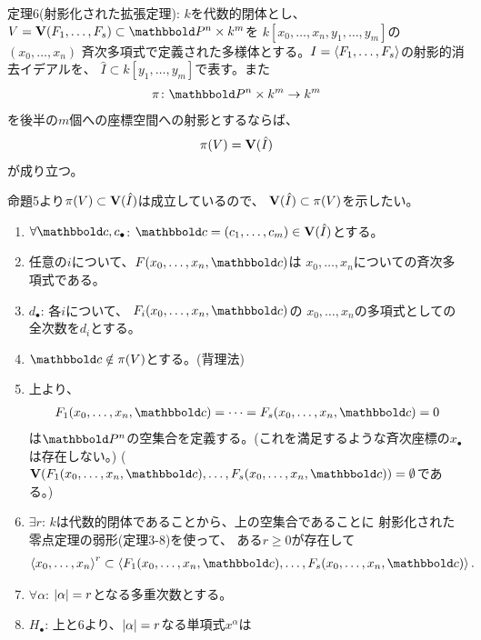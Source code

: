 \begin{framed}
  定理6(射影化された拡張定理):
  $k$を代数的閉体とし、$V=\var(F_1,\dots,F_s) \subset \P^n \times k^m$を
  $k[x_0,\dots,x_n,y_1,\dots,y_m]$の$(x_0,\dots,x_n)$
  斉次多項式で定義された多様体とする。$I=\left\langle F_1,\dots,F_s \right\rangle$の射影的消去イデアルを、
  $\hat I \subset k[y_1,\dots,y_m]$で表す。また
  \begin{align}
    \pi\colon \P^n \times k^m \to k^m
  \end{align}
  を後半の$m$個への座標空間への射影とするならば、
  \begin{align}
    \pi(V) = \textbf V(\hat I)
  \end{align}
  が成り立つ。
\end{framed}
\begin{myproof}
   命題5より$\pi(V)\subset \textbf V(\hat I)$は成立しているので、
   $\textbf V(\hat I) \subset \pi(V)$を示したい。
   \begin{enumerate}
     \item $\forall \bbold c, c_\bullet$:
     $\bbold c = (c_1,\dots,c_m) \in \var(\hat I)$とする。
     \item 任意の$i$について、$F(x_0,\dots,x_n,\bbold c)$は
     $x_0,\dots,x_n$についての斉次多項式である。
     \item $d_\bullet$:
      各$i$について、 $F_i(x_0,\dots,x_n,\bbold c)$の
      $x_0,\dots,x_n$の多項式としての全次数を$d_i$とする。
    \item $\bbold c \notin \pi(V)$とする。(背理法)
    \item
    上より、
    \begin{align}
      F_1(x_0,\dots,x_n,\bbold c) = \dots =
      F_s(x_0,\dots,x_n,\bbold c) = 0
    \end{align}
    は$\P^n$の空集合を定義する。(これを満足するような斉次座標の$x_\bullet$は存在しない。)
    ($\var(F_1(x_0,\dots,x_n,\bbold c),\dots, F_s(x_0,\dots,x_n,\bbold c)) = \emptyset$である。)
    \item $\exists r$:
    $k$は代数的閉体であることから、上の空集合であることに
    射影化された零点定理の弱形(定理3-8)を使って、
    ある$r\ge 0$が存在して
    \begin{align}
      \gen{x_0,\dots,x_n}^r
      \subset
      \gen{F_1(x_0,\dots,x_n,\bbold c),\dots,F_s(x_0,\dots,x_n,\bbold c)}.
    \end{align}
    \item $\forall \alpha$: $\left|\alpha\right| = r$となる多重次数とする。
    \item $H_\bullet$:
    上と6より、$\left|\alpha\right| = r$なる単項式$x^\alpha$は

\end{enumerate}
\end{myproof}

